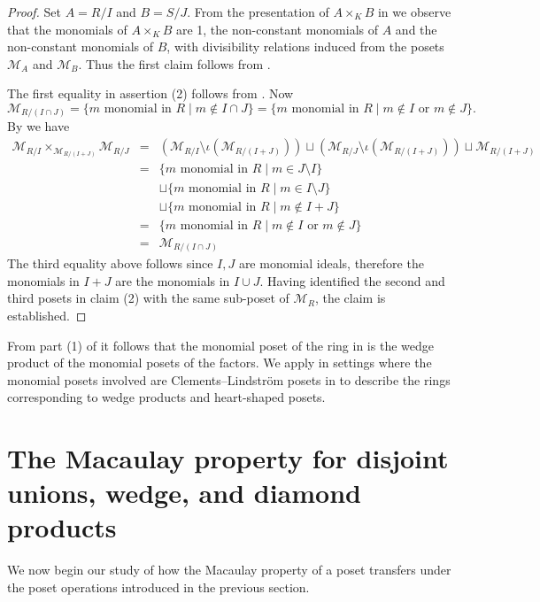\documentclass[11pt, reqno]{amsart}
\newcommand{\M}{{\mathcal M}}
\theoremstyle{plain} %
\theoremstyle{definition}
\theoremstyle{remark}
\numberwithin{equation}{section}  %
\begin{document}
\begin{proof}
Set $A=R/I$ and $B=S/J$. From the presentation of $A\times_K B$ in  we observe that the monomials of 
$A\times_K B$ are 1, the non-constant monomials of $A$ and the non-constant monomials of $B$, with divisibility relations induced from the posets $\M_A$ and $\M_B$. Thus the first claim follows from .


The first equality in assertion (2) follows from . Now 
\[
\M_{R/(I\cap J)}=\{m \text{ monomial in } R \mid m\not \in I\cap J\}=\{m \text{ monomial in } R \mid m\not \in I \text{ or } m \not\in J\}.
\]
By  we have
\begin{eqnarray*}
\M_{R/I} \times _{\M_{R/(I+J)}} \M_{R/J} &=& \left( \M_{R/I} \setminus \iota( \M_{R/(I+J)}) \right) \sqcup  \left( \M_{R/J} \setminus \iota( \M_{R/(I+J)}) \right) \sqcup \M_{R/(I+J)} \\
&=& \{m \text{ monomial in } R \mid m\in J\setminus I\} \\
& & \sqcup \{m \text{ monomial in } R \mid m\in I\setminus J\}\\
& & \sqcup  \{m \text{ monomial in } R \mid m \not \in I+J\} \\
&= &\{m \text{ monomial in } R \mid m\not \in I \text{ or } m \not\in J\} \\ 
&= &\M_{R/(I\cap J)}
\end{eqnarray*}
The third equality above follows since $I, J$ are monomial ideals, therefore the monomials in $I+J$ are the monomials in $I\cup J$. Having identified the second and third posets in claim (2) with the same sub-poset of $\M_R$, the claim is established. 
\end{proof}

From part (1) of  it follows that the monomial poset of the ring in  is the wedge product of the monomial posets of the factors. We apply   in  settings where the monomial posets involved are Clements--Lindstr\"om posets in  to describe the rings corresponding to wedge products and heart-shaped posets.


\section{The Macaulay property for disjoint unions, wedge, and diamond products}\label{s: uwd}

We now begin our study of how the Macaulay property of a poset transfers under the poset operations introduced in the previous section. 
\end{document}
